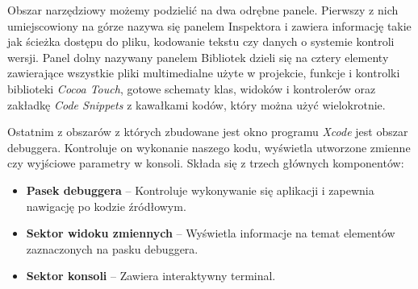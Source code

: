 \documentclass{iiuwb}
\begin{document}
Obszar narzędziowy możemy podzielić na dwa odrębne panele. Pierwszy z nich umiejscowiony na górze nazywa się panelem Inspektora i zawiera informację takie jak ścieżka dostępu do pliku, kodowanie tekstu czy danych o systemie kontroli wersji. Panel dolny nazywany panelem Bibliotek dzieli się na cztery elementy zawierające wszystkie pliki multimedialne użyte w projekcie, funkcje i kontrolki biblioteki \textit{Cocoa Touch}, gotowe schematy klas, widoków i kontrolerów oraz zakładkę \textit{Code Snippets} z kawałkami kodów, który można użyć wielokrotnie.

Ostatnim z obszarów z których zbudowane jest okno programu \textit{Xcode} jest obszar debuggera. Kontroluje on wykonanie naszego kodu, wyświetla utworzone zmienne czy wyjściowe parametry w konsoli. Składa się z trzech głównych komponentów:
\begin{itemize}
\item \textbf{Pasek debuggera} -- Kontroluje wykonywanie się aplikacji i zapewnia nawigację po kodzie źródłowym. 
\item \textbf{Sektor widoku zmiennych} -- Wyświetla informacje na temat elementów zaznaczonych na pasku debuggera.
\item \textbf{Sektor konsoli} -- Zawiera interaktywny terminal.
\end{itemize}
\end{document}
